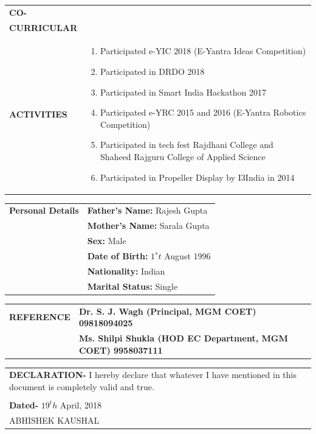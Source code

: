 \documentclass{article}
\begin{document}
\begin{table}[h]
    \begin{tabular}{l  p{}} 
      \textbf{\Large{CO-}} \\  \textbf{\Large{CURRICULAR}}\\ \textbf{\Large{ACTIVITIES}}&
	\begin{enumerate}
	\item Participated e-YIC 2018 (E-Yantra Ideas Competition)
	\item Participated in DRDO 2018
	\item Participated in Smart India Hackathon 2017
	\item Participated e-YRC 2015 and 2016 (E-Yantra Robotics Competition)
	\item Participated in tech fest Rajdhani College and Shaheed Rajguru College of Applied Science
	\item Participated in Propeller Display by I3India in 2014
   	\end{enumerate} 
    \end{tabular}
\end{table}

\begin{table}[h!]
    \begin{tabular}{l  l} 
      \textbf{\Large{Personal Details}} &
	\textbf{Father's Name: } Rajesh Gupta \\
	&\textbf{Mother's Name: } Sarala Gupta\\
	&\textbf{Sex: } Male\\
	&\textbf{Date of Birth: } $1^st$ August 1996\\
	&\textbf{Nationality: } Indian\\
	&\textbf{Marital Status: } Single\\
   	 
    \end{tabular}
\end{table}

\begin{table}[h!]
    \begin{tabular}{l  l} 
      \textbf{\Large{REFERENCE}} & 
   	 \textbf{Dr. S. J. Wagh (Principal, MGM COET) 09818094025} \\
	 &\textbf{Ms. Shilpi Shukla (HOD EC Department, MGM COET) 9958037111} \\
    \end{tabular}
\end{table}
\begin{table}[h!]
    \begin{tabular}{l } 
       \textbf{\Large{DECLARATION-}} I hereby declare that whatever I have mentioned in this document is completely valid and true.\\ \\

	\textbf{\large{Dated-}} $19^th$ April, 2018\\
      	ABHISHEK KAUSHAL
    \end{tabular}
\end{table}
\end{document}
